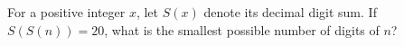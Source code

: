 For a positive integer $x$, let $S(x)$ denote its decimal digit sum. If $S(S(n))=20$, what is the smallest possible number of digits of $n$?
